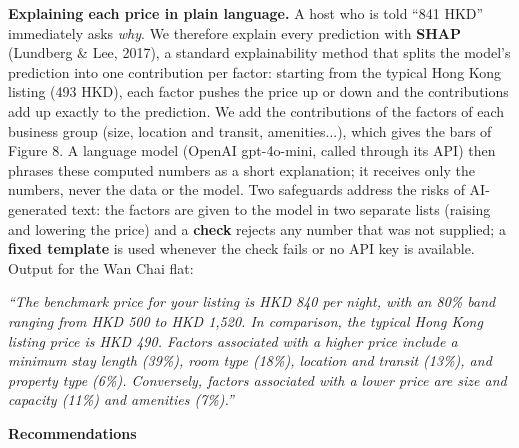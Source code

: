 \documentclass[10pt,a4paper]{article}
\begin{document}
{\textbf{Explaining each price in plain language.} A host who is told ``841 HKD'' immediately asks \textit{why}. We therefore explain every prediction with \textbf{SHAP} (Lundberg \& Lee, 2017), a standard explainability method that splits the model's prediction into one contribution per factor: starting from the typical Hong Kong listing (493 HKD), each factor pushes the price up or down and the contributions add up exactly to the prediction. We add the contributions of the factors of each business group (size, location and transit, amenities...), which gives the bars of Figure 8. A language model (OpenAI gpt-4o-mini, called through its API) then phrases these computed numbers as a short explanation; it receives only the numbers, never the data or the model. Two safeguards address the risks of AI-generated text: the factors are given to the model in two separate lists (raising and lowering the price) and a \textbf{check} rejects any number that was not supplied; a \textbf{fixed template} is used whenever the check fails or no API key is available. Output for the Wan Chai flat:\par}\vspace{-2.5pt}
{\fontsize{9}{10.8}\selectfont \color{grey} \itshape ``The benchmark price for your listing is HKD 840 per night, with an 80\% band ranging from HKD 500 to HKD 1,520. In comparison, the typical Hong Kong listing price is HKD 490. Factors associated with a higher price include a minimum stay length (39\%), room type (18\%), location and transit (13\%), and property type (6\%). Conversely, factors associated with a lower price are size and capacity (11\%) and amenities (7\%).''\par}\vspace{-0.5pt}
{\raggedright \textbf{Recommendations}\par}\vspace{-3.5pt}\nopagebreak[4]
\end{document}

